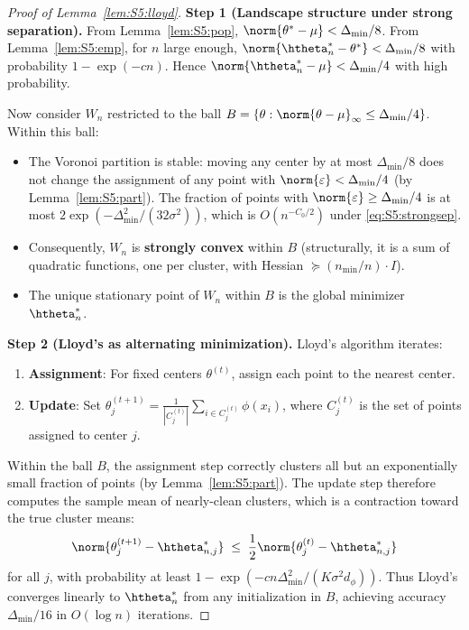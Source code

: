 \begin{proof}[Proof of Lemma~\ref{lem:S5:lloyd}]

\noindent\textbf{Step 1 (Landscape structure under strong separation).}
From Lemma~\ref{lem:S5:pop}, $\norm{\theta^*-\mu}<\Delta_{\min}/8$.
From Lemma~\ref{lem:S5:emp}, for $n$ large enough,
$\norm{\htheta_n^*-\theta^*}<\Delta_{\min}/8$ with probability
$1-\exp(-c n)$.  Hence $\norm{\htheta_n^*-\mu}<\Delta_{\min}/4$ with
high probability.

Now consider $W_n$ restricted to the ball
$B=\{\theta:\norm{\theta-\mu}_\infty\le\Delta_{\min}/4\}$.  Within this
ball:
\begin{itemize}
\item The Voronoi partition is stable: moving any center by at most
$\Delta_{\min}/8$ does not change the assignment of any point with
$\norm{\varepsilon}<\Delta_{\min}/4$ (by Lemma~\ref{lem:S5:part}).
The fraction of points with $\norm{\varepsilon}\ge\Delta_{\min}/4$ is
at most $2\exp(-\Delta_{\min}^2/(32\sigma^2))$, which is
$O(n^{-C_0/2})$ under \eqref{eq:S5:strongsep}.
\item Consequently, $W_n$ is \textbf{strongly convex} within $B$
(structurally, it is a sum of quadratic functions, one per cluster,
with Hessian $\succeq (n_{\min}/n)\cdot I$).
\item The unique stationary point of $W_n$ within $B$ is the global
minimizer $\htheta_n^*$.
\end{itemize}

\noindent\textbf{Step 2 (Lloyd's as alternating minimization).}
Lloyd's algorithm iterates:
\begin{enumerate}
\item \textbf{Assignment}: For fixed centers $\theta^{(t)}$, assign each
point to the nearest center.
\item \textbf{Update}: Set
$\theta_j^{(t+1)}=\frac1{|C_j^{(t)}|}\sum_{i\in C_j^{(t)}}\phi(x_i)$,
where $C_j^{(t)}$ is the set of points assigned to center $j$.
\end{enumerate}
Within the ball $B$, the assignment step correctly clusters all but an
exponentially small fraction of points (by Lemma~\ref{lem:S5:part}).
The update step therefore computes the sample mean of nearly-clean
clusters, which is a contraction toward the true cluster means:
\[
\norm{\theta_j^{(t+1)}-\htheta_{n,j}^*}
\;\le\; \frac12\norm{\theta_j^{(t)}-\htheta_{n,j}^*}
\]
for all $j$, with probability at least
$1-\exp(-c n\Delta_{\min}^2/(K\sigma^2 d_\phi))$.  Thus Lloyd's converges
linearly to $\htheta_n^*$ from any initialization in $B$, achieving
accuracy $\Delta_{\min}/16$ in $O(\log n)$ iterations.


\end{proof}

